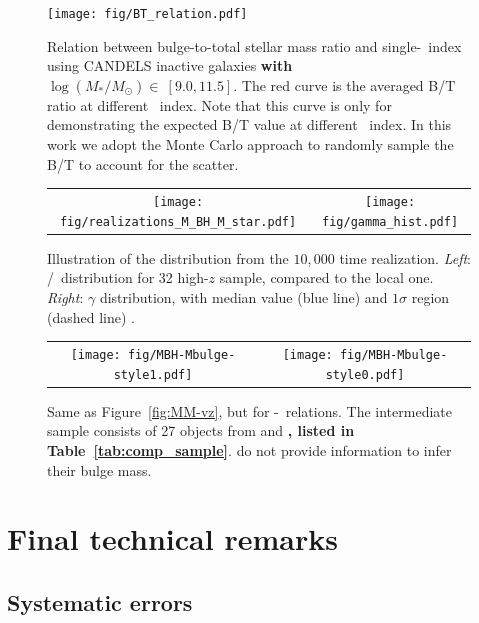 \documentclass[apj]{emulateapj}
\begin{document}
\begin{figure}
\centering
{
\texttt{[image: fig/BT\_relation.pdf]}
}
\caption{\label{fig:BT-n_relation} 
Relation between bulge-to-total stellar mass ratio and single-\sersic\ index using CANDELS inactive galaxies {\bf with $\log (M_*/M_{\odot})\in~[9.0, 11.5]$}. The red curve is the averaged B/T ratio at different \sersic\ index. Note that this curve is only for demonstrating the expected B/T value at different \sersic\ index. In this work we adopt the Monte Carlo approach to randomly sample the B/T to account for the scatter.
}
\end{figure} 

\begin{figure}
\centering
\begin{tabular}{c c}
{\texttt{[image: fig/realizations\_M\_BH\_M\_star.pdf]}}&
{\texttt{[image: fig/gamma\_hist.pdf]}}\\
\end{tabular}
\caption{\label{fig:gamma_hist} 
Illustration of the distribution from the $10,000$ time realization. {\it Left}: \mbh/\smass\ distribution for 32 high-$z$ sample, compared to the local one. {\it Right}: $\gamma$ distribution, with median value (blue line) and $1\sigma$ region (dashed line) .
}
\end{figure}

\begin{figure}
\centering
\begin{tabular}{c c}
{\texttt{[image: fig/MBH-Mbulge-style1.pdf]}}&
{\texttt{[image: fig/MBH-Mbulge-style0.pdf]}}\\
\end{tabular}
\caption{\label{fig:MM_bulge-vz}
Same as Figure~\ref{fig:MM-vz}, but for \mbh-\bmass\ relations. The intermediate sample consists of 27 objects from \citet{Bennert11} and \citet{SS13}{\bf , listed in Table~\ref{tab:comp_sample}}. \citet{Cisternas2011} do not provide information to infer their bulge mass.}
\end{figure} 


\section{Final technical remarks}
\label{sec:dis}


\subsection{Systematic errors}\label{sec:sysm_err}
\end{document}
